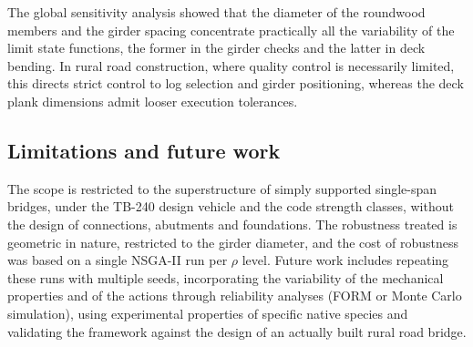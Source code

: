The global sensitivity analysis showed that the diameter of the roundwood members and the girder spacing concentrate practically all the variability of the limit state functions, the former in the girder checks and the latter in deck bending.
In rural road construction, where quality control is necessarily limited, this directs strict control to log selection and girder positioning, whereas the deck plank dimensions admit looser execution tolerances.

\subsection*{Limitations and future work}

The scope is restricted to the superstructure of simply supported single-span bridges, under the TB-240 design vehicle and the code strength classes, without the design of connections, abutments and foundations.
The robustness treated is geometric in nature, restricted to the girder diameter, and the cost of robustness was based on a single NSGA-II run per $\rho$ level.
Future work includes repeating these runs with multiple seeds, incorporating the variability of the mechanical properties and of the actions through reliability analyses (FORM or Monte Carlo simulation), using experimental properties of specific native species and validating the framework against the design of an actually built rural road bridge.
